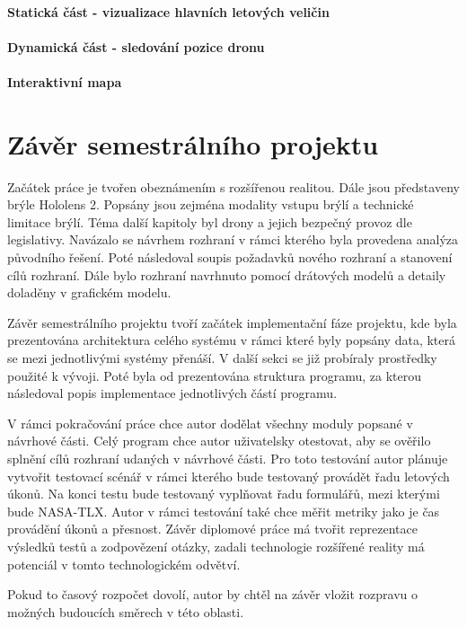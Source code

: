 \subsubsection{Statická část - vizualizace hlavních letových veličin}
\subsubsection{Dynamická část - sledování pozice dronu}
\subsubsection{Interaktivní mapa}


\chapter{Závěr semestrálního projektu}
Začátek práce je tvořen obeznámením s rozšířenou realitou. Dále jsou představeny brýle Hololens 2. Popsány jsou zejména modality vstupu brýlí a technické limitace brýlí. Téma další kapitoly byl drony a jejich bezpečný provoz dle legislativy. Navázalo se návrhem rozhraní v rámci kterého byla provedena analýza původního řešení. Poté následoval soupis požadavků nového rozhraní a stanovení cílů rozhraní. Dále bylo rozhraní navrhnuto pomocí drátových modelů a detaily doladěny v grafickém modelu. 

Závěr semestrálního projektu tvoří začátek implementační fáze projektu, kde byla prezentována architektura celého systému v rámci které byly popsány data, která se mezi jednotlivými systémy přenáší. V další sekci se již probíraly prostředky použité k vývoji. Poté byla od prezentována struktura programu, za kterou následoval popis implementace jednotlivých částí programu. 

V rámci pokračování práce chce autor dodělat všechny moduly popsané v návrhové části. Celý program chce autor uživatelsky otestovat, aby se ověřilo splnění cílů rozhraní udaných v návrhové části. Pro toto testování autor plánuje vytvořit testovací scénář v rámci kterého bude testovaný provádět řadu letových úkonů. Na konci testu bude testovaný vyplňovat řadu formulářů, mezi kterými bude NASA-TLX. Autor v rámci testování také chce měřit metriky jako je čas provádění úkonů a přesnost. Závěr diplomové práce má tvořit reprezentace výsledků testů a zodpovězení otázky, zadali technologie rozšířené reality má potenciál v tomto technologickém odvětví.

Pokud to časový rozpočet dovolí, autor by chtěl na závěr vložit rozpravu o možných budoucích směrech v této oblasti.

